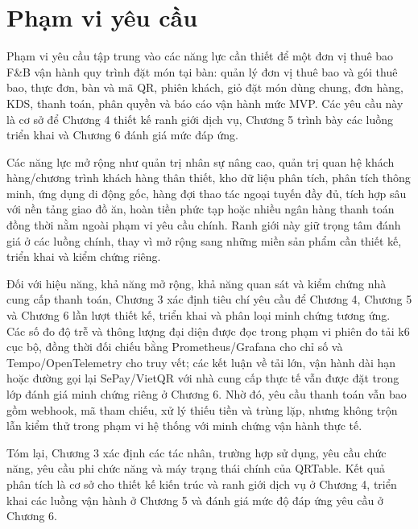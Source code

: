 \section{Phạm vi yêu cầu}

Phạm vi yêu cầu tập trung vào các năng lực cần thiết để một đơn vị thuê bao F\&B vận hành quy trình đặt món tại bàn: quản lý đơn vị thuê bao và gói thuê bao, thực đơn, bàn và mã QR, phiên khách, giỏ đặt món dùng chung, đơn hàng, KDS, thanh toán, phân quyền và báo cáo vận hành mức MVP. Các yêu cầu này là cơ sở để Chương 4 thiết kế ranh giới dịch vụ, Chương 5 trình bày các luồng triển khai và Chương 6 đánh giá mức đáp ứng.

Các năng lực mở rộng như quản trị nhân sự nâng cao, quản trị quan hệ khách hàng/chương trình khách hàng thân thiết, kho dữ liệu phân tích, phân tích thông minh, ứng dụng di động gốc, hàng đợi thao tác ngoại tuyến đầy đủ, tích hợp sâu với nền tảng giao đồ ăn, hoàn tiền phức tạp hoặc nhiều ngân hàng thanh toán đồng thời nằm ngoài phạm vi yêu cầu chính. Ranh giới này giữ trọng tâm đánh giá ở các luồng chính, thay vì mở rộng sang những miền sản phẩm cần thiết kế, triển khai và kiểm chứng riêng.

Đối với hiệu năng, khả năng mở rộng, khả năng quan sát và kiểm chứng nhà cung cấp thanh toán, Chương 3 xác định tiêu chí yêu cầu để Chương 4, Chương 5 và Chương 6 lần lượt thiết kế, triển khai và phân loại minh chứng tương ứng. Các số đo độ trễ và thông lượng đại diện được đọc trong phạm vi phiên đo tải k6 cục bộ, đồng thời đối chiếu bằng Prometheus/Grafana cho chỉ số và Tempo/OpenTelemetry cho truy vết; các kết luận về tải lớn, vận hành dài hạn hoặc đường gọi lại SePay/VietQR với nhà cung cấp thực tế vẫn được đặt trong lớp đánh giá minh chứng riêng ở Chương 6. Nhờ đó, yêu cầu thanh toán vẫn bao gồm webhook, mã tham chiếu, xử lý thiếu tiền và trùng lặp, nhưng không trộn lẫn kiểm thử trong phạm vi hệ thống với minh chứng vận hành thực tế.

Tóm lại, Chương 3 xác định các tác nhân, trường hợp sử dụng, yêu cầu chức năng, yêu cầu phi chức năng và máy trạng thái chính của QRTable. Kết quả phân tích là cơ sở cho thiết kế kiến trúc và ranh giới dịch vụ ở Chương 4, triển khai các luồng vận hành ở Chương 5 và đánh giá mức độ đáp ứng yêu cầu ở Chương 6.
